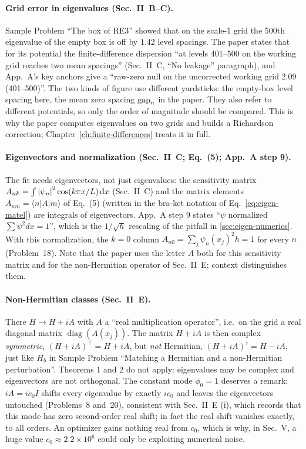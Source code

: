 \paragraph{Grid error in eigenvalues (Sec.~II~B--C).} Sample Problem ``The box of RE3'' showed that on the scale-1 grid the 500th eigenvalue of the empty box is off by $1.42$ level spacings. The paper states that for its potential the finite-difference dispersion ``at levels 401--500 on the working grid reaches two mean spacings'' (Sec.~II~C, ``No leakage'' paragraph), and App.~A's key anchors give a ``raw-zero null on the uncorrected working grid $2.09$ (401--500)''. The two kinds of figure use different yardsticks: the empty-box level spacing here, the mean zero spacing $\mathrm{gap}_n$ in the paper. They also refer to different potentials, so only the order of magnitude should be compared. This is why the paper computes eigenvalues on two grids and builds a Richardson correction; Chapter~\ref{ch:finite-differences} treats it in full.

\paragraph{Eigenvectors and normalization (Sec.~II~C; Eq.~(5); App.~A step 9).} The fit needs eigenvectors, not just eigenvalues: the sensitivity matrix $A_{nk}=\int\left\lvert \psi_n\right\rvert^2\cos(k\pi x/L)\,\mathrm{d} x$ (Sec.~II~C) and the matrix elements $A_{nm}=\langle n|A|m\rangle$ of Eq.~(5) (written in the bra-ket notation of Eq.~\eqref{eq:eigen-matel}) are integrals of eigenvectors. App.~A step 9 states ``$\psi$ normalized $\sum\psi^2dx=1$'', which is the $1/\sqrt h$ rescaling of the pitfall in \cref{sec:eigen-numerics}. With this normalization, the $k=0$ column $A_{n0}=\sum_j\psi_n(x_j)^2h=1$ for every $n$ (Problem~18). Note that the paper uses the letter $A$ both for this sensitivity matrix and for the non-Hermitian operator of Sec.~II~E; context distinguishes them.

\paragraph{Non-Hermitian classes (Sec.~II~E).} There $H\to H+iA$ with $A$ a ``real multiplication operator'', i.e.\ on the grid a real diagonal matrix $\operatorname{diag}(A(x_j))$. The matrix $H+iA$ is then complex \emph{symmetric}, $(H+iA)^\top=H+iA$, but \emph{not} Hermitian, $(H+iA)^\dagger=H-iA$, just like $H_b$ in Sample Problem ``Matching a Hermitian and a non-Hermitian perturbation''. Theorems 1 and 2 do not apply: eigenvalues may be complex and eigenvectors are not orthogonal. The constant mode $\phi_0=1$ deserves a remark: $iA=ic_0I$ shifts every eigenvalue by exactly $ic_0$ and leaves the eigenvectors untouched (Problems~8 and~20), consistent with Sec.~II~E (i), which records that this mode has zero second-order real shift; in fact the real shift vanishes exactly, to all orders. An optimizer gains nothing real from $c_0$, which is why, in Sec.~V, a huge value $c_0\approx2.2\times10^6$ could only be exploiting numerical noise.

